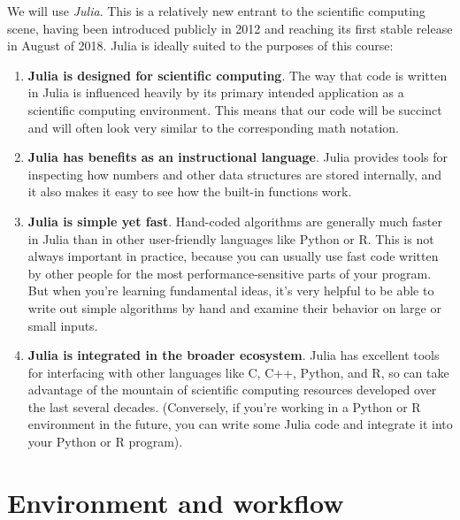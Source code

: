 \documentclass[prettycode,jlmin,shellescape]{watsonbook}
\begin{document}
We will use \textit{Julia}. This is a relatively new entrant to the
scientific computing scene, having been introduced publicly in 2012
and reaching its first stable release in August of 2018. Julia is
ideally suited to the purposes of this course:
\begin{enumerate}
\item \textbf{Julia is designed for scientific computing}. The way
  that code is written in Julia is influenced heavily by its primary
  intended application as a scientific computing environment. This
  means that our code will be succinct and will often look very
  similar to the corresponding math notation. 
\item \textbf{Julia has benefits as an instructional language}. Julia
  provides tools for inspecting how numbers and other data structures
  are stored internally, and it also makes it easy to see how the
  built-in functions work. 
\item \textbf{Julia is simple yet fast}. Hand-coded algorithms are
  generally much faster in Julia than in other user-friendly languages
  like Python or R. This is not always important in practice, because
  you can usually use fast code written by other people for the most
  performance-sensitive parts of your program. But when you're
  learning fundamental ideas, it's very helpful to be able to write
  out simple algorithms by hand and examine their behavior on large or
  small inputs. 
\item \textbf{Julia is integrated in the broader ecosystem}. Julia has
  excellent tools for interfacing with other languages like C, C++,
  Python, and R, so can take advantage of the mountain of scientific
  computing resources developed over the last several
  decades. (Conversely, if you're working in a Python or R environment
  in the future, you can write some Julia code and integrate it into
  your Python or R program).
\end{enumerate}

\section{Environment and workflow}
\end{document}
